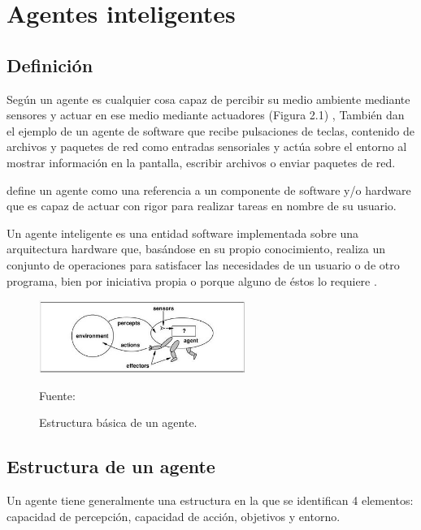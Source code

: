 \section{Agentes inteligentes}
\subsection{Definición}

Según \cite{Russel} un agente es cualquier cosa capaz de percibir su medio ambiente mediante sensores y actuar en ese medio mediante actuadores (Figura 2.1) , También dan el ejemplo de  un agente de software que recibe pulsaciones de teclas, contenido de archivos y paquetes de red como entradas sensoriales y actúa sobre el entorno al mostrar información en la pantalla, escribir archivos o enviar paquetes de red.

\cite{Nwana} define un agente como una referencia a un componente de software y/o hardware que es capaz de actuar con rigor para realizar tareas en nombre de su usuario.

Un agente inteligente es una entidad software implementada sobre una arquitectura hardware que, basándose en su propio conocimiento, realiza un conjunto de operaciones para satisfacer las necesidades de un usuario o de otro programa, bien por iniciativa propia o porque alguno de éstos lo requiere \citep{Wooldridge}.


\begin{figure}[ht]
\begin{center}
\includegraphics[width=0.6\textwidth]{Imagen2}
\end{center}
\begin{center}
\vskip -0.5cm
\caption{\small{Estructura básica de un agente.}}
{\small{Fuente: \cite{Russel}}}
\end{center}
\end{figure}


\vskip 3cm

\subsection{Estructura de un agente}

Un agente tiene generalmente una estructura en la que se identifican 4 elementos: capacidad de percepción, capacidad de acción, objetivos y entorno.

